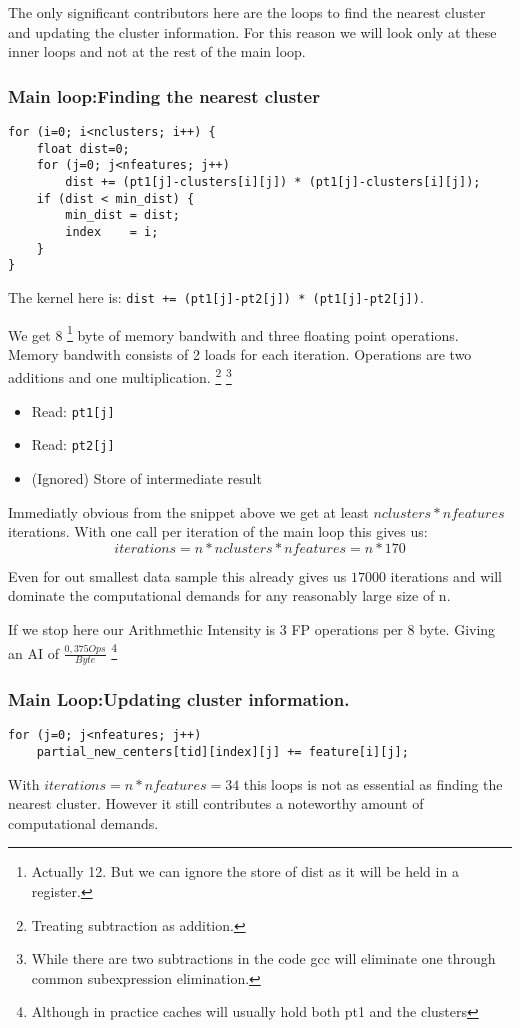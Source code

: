 \documentclass[]{article}
\begin{document}
The only significant contributors here are the loops to find the nearest cluster and updating the cluster information.
For this reason we will look only at these inner loops and not at the rest of the main loop.


\subsubsection{Main loop:Finding the nearest cluster}
\begin{lstlisting}[caption={Inlined representation of find\_nearest\_point}]
for (i=0; i<nclusters; i++) {
	float dist=0;
	for (j=0; j<nfeatures; j++)
		dist += (pt1[j]-clusters[i][j]) * (pt1[j]-clusters[i][j]);
	if (dist < min_dist) {
		min_dist = dist;
		index    = i;
	}
}
\end{lstlisting}
The kernel here is: \texttt{dist += (pt1[j]-pt2[j]) * (pt1[j]-pt2[j])}.\newline

We get 8
\footnote{Actually 12. But we can ignore the store of dist as it will be held in a register.}
byte of memory bandwith and three floating point operations.
Memory bandwith consists of 2 loads for each iteration.
Operations are two additions and one multiplication.
\footnote{Treating subtraction as addition.}
\footnote{While there are two subtractions in the code gcc will eliminate one through common subexpression elimination.}
\begin{itemize}[noitemsep,nolistsep]
	\item Read: \texttt{pt1[j]}
	\item Read: \texttt{pt2[j]}
	\item (Ignored) Store of intermediate result
\end{itemize}

Immediatly obvious from the snippet above we get at least $nclusters * nfeatures$ iterations.
With one call per iteration of the main loop this gives us:\\
$$iterations = n * nclusters * nfeatures = n * 170$$

Even for out smallest data sample this already gives us $17000$ iterations and will dominate the computational demands for any reasonably large size of n.

If we stop here our Arithmethic Intensity is 3 FP operations per 8 byte. Giving an AI of $\frac{0,375 Ops}{Byte}$
\footnote{Although in practice caches will usually hold both pt1 and the clusters}


\subsubsection{Main Loop:Updating cluster information.}
\begin{lstlisting}[caption={Updating (partial) cluster information},label=lblUpdPartClst]
for (j=0; j<nfeatures; j++)
	partial_new_centers[tid][index][j] += feature[i][j];
\end{lstlisting}
With $iterations = n * nfeatures = 34$ this loops is not as essential as finding the nearest cluster.
However it still contributes a noteworthy amount of computational demands.
\end{document}
